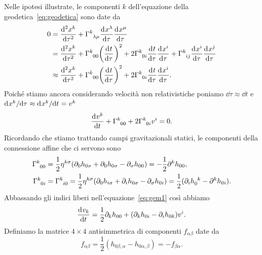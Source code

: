 Nelle ipotesi illustrate, le componenti $k$ dell'equazione della
geodetica~\eqref{eq:geodetica} sono date da
\begin{equation}
    \begin{split}
    0 &= \toder[2]{x^{k}}{\tau} + \tensor{\Gamma}{^{k}_{\lambda\mu}}
    \toder{x^{\lambda}}{\tau} \toder{x^{\mu}}{\tau} \\
    &= \toder[2]{x^{k}}{\tau} + \tensor{\Gamma}{^{k}_{00}} \bigg(
    \toder{t}{\tau} \bigg)^{2} + 2\tensor{\Gamma}{^{k}_{0i}}\toder{t}{\tau}
    \toder{x^{i}}{\tau} + \tensor{\Gamma}{^{k}_{ij}} \toder{x^{i}}{\tau}
    \toder{x^{j}}{\tau} \\
    &\approx \toder[2]{x^{k}}{\tau} + \tensor{\Gamma}{^{k}_{00}}\bigg(
    \toder{t}{\tau} \bigg)^{2} + 2\tensor{\Gamma}{^{k}_{0i}}\toder{t}{\tau}
    \toder{x^{i}}{\tau}.
  \end{split}
\end{equation}
Poiché stiamo ancora considerando velocità non relativistiche poniamo
$\dd \tau \approx \dd t$ e
$\mathrm{d}^{}x^{k} / \mathrm{d} {\tau}^{} \approx \mathrm{d}^{}x^{k} / \mathrm{d} {t}^{} = v^{k}$
\begin{equation}
  \label{eq:gem1}
  \toder{v^{k}}{t} + \tensor{\Gamma}{^{k}_{00}} +
  2\tensor{\Gamma}{^{k}_{0i}}v^{i} = 0.
\end{equation}
Ricordando che stiamo trattando campi gravitazionali statici, le componenti
della connessione affine che ci servono sono
\begin{subequations}
  \begin{align}
    \tensor{\Gamma}{^{k}_{00}} &=
    \frac{1}{2}\eta^{k\sigma}(\partial_{0}h_{0\sigma} + \partial_{0}h_{0\sigma}
    - \partial_{\sigma}h_{00}) = - \frac{1}{2}\partial^{k}h_{00}, \\
    \tensor{\Gamma}{^{k}_{0i}} &= \tensor{\Gamma}{^{k}_{i0}} =
    \frac{1}{2}\eta^{k\sigma} (\partial_{0}h_{i\sigma} + \partial_{i}h_{0\sigma}
    - \partial_{\sigma}h_{0i}) = \frac{1}{2}(\partial_{i}\tensor{h}{_{0}^{k}}
    - \partial^{k}h_{0i}).
  \end{align}
\end{subequations}
Abbassando gli indici liberi nell'equazione~\eqref{eq:gem1} così abbiamo
\begin{equation}
  \label{eq:gem2}
  \frac{{\mathop{}\!\mathrm{d}^{}}v_{k}}{\mathop{}\!\mathrm{d} {t}^{}} = \frac{1}{2}\partial_{k}h_{00} + (\partial_{k}h_{0i}
  - \partial_{i}h_{0k})v^{i}.
\end{equation}
Definiamo la matrice $4 \times 4$ antisimmetrica di componenti $f_{\alpha\beta}$
date da
\begin{equation}
  f_{\alpha\beta} = \frac{1}{2}(h_{0\beta,\alpha} - h_{0\alpha,\beta}) =
  -f_{\beta\alpha}.
\end{equation}
